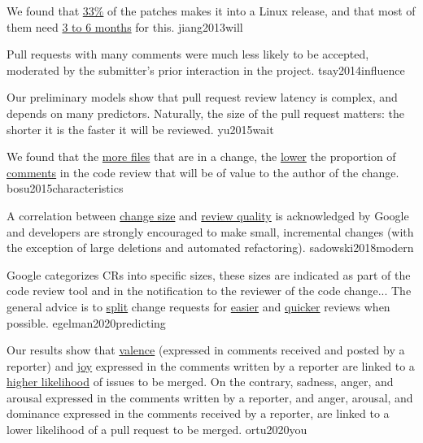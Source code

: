 \documentclass{article}
\begin{document}

  {We found that \ul{33\%} of the patches makes it into a Linux release, and that most of them need \ul{3 to 6 months} for this.}
  {jiang2013will}


  {Pull requests with many comments were much less likely to be accepted, moderated by the submitter's prior interaction in the project.}
  {tsay2014influence}

  {Our preliminary models show that pull request review latency is complex, and depends on many predictors. Naturally, the size of the pull request matters: the shorter it is the faster it will be reviewed.}
  {yu2015wait}

  {We found that the \ul{more files} that are in a change, the \ul{lower} the proportion of \ul{comments} in the code review that will be of value to the author of the change.}
  {bosu2015characteristics}

  {A correlation between \ul{change size} and \ul{review quality} is acknowledged by Google and developers are strongly encouraged to make small, incremental changes (with the exception of large deletions and automated refactoring).}
  {sadowski2018modern}


  {Google categorizes CRs into specific sizes, these sizes are indicated as part of the code review tool and in the notification to the reviewer of the code change... The general advice is to \ul{split} change requests for \ul{easier} and \ul{quicker} reviews when possible.}
  {egelman2020predicting}


  {Our results show that \ul{valence} (expressed in comments received and posted by a reporter) and \ul{joy} expressed in the comments written by a reporter are linked to a \ul{higher likelihood} of issues to be merged. On the contrary, sadness, anger, and arousal expressed in the comments written by a reporter, and anger, arousal, and dominance expressed in the comments received by a reporter, are linked to a lower likelihood of a pull request to be merged.}
  {ortu2020you}
\end{document}
